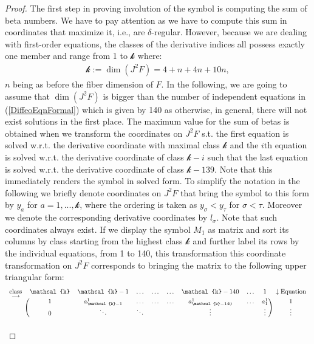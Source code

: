 \begin{proof}
The first step in proving involution of the symbol is computing the sum of beta numbers. We have to pay attention as we have to compute this sum in coordinates that maximize it, i.e., are $\delta$-regular. However, because we are dealing with first-order equations, the classes of the derivative indices all possess exactly one member and range from 1 to $\mathcal{k}$ where: 
\begin{align}
    \mathcal{k} := \operatorname{dim}(J^2F) = 4+n+4n+10n,
\end{align}
$n$ being as before the fiber dimension of $F$. 
In the following, we are going to assume that $\operatorname{dim}(J^2F)$ is bigger than the number of independent equations in (\ref{DiffeoEqnFormal}) which is given by 140 as otherwise, in general, there will not exist solutions in the first place. 
The maximum value for the sum of betas is obtained when we transform the coordinates on $J^2F$ s.t. the first equation is solved w.r.t. the derivative coordinate with maximal class $\mathcal{k}$ and the $i$th equation is solved w.r.t. the derivative coordinate of class $\mathcal{k}-i$ such that the last equation is solved w.r.t. the derivative coordinate of class $\mathcal{k}-139$.
Note that this immediately renders the symbol in solved form.
To simplify the notation in the following we briefly denote coordinates on $J^2F$ that bring the symbol to this form by $y_a$ for $a = 1,...,\mathcal{k}$, where the ordering is taken as $y_{\sigma} < y_{\tau}$ for $\sigma < \tau$. Moreover we denote the corresponding derivative coordinates by $l_{\sigma}$. 
Note that such coordinates always exist. 
If we display the symbol $M_1$ as matrix and sort its columns by class starting from the highest class $\mathcal{k}$ and further label its rows by the individual equations, from 1 to 140, this transformation this coordinate transformation on $J^2F$ corresponds to bringing the matrix to the following upper triangular form:
\begin{align}\label{symbolMat}
\begin{blockarray}{cccccccccc}
\underset{\longrightarrow}{\text{class}} & \mathcal{k} & \mathcal{k} -1 & \hdots & \hdots & \hdots & \mathcal{k}- 140 & \hdots & 1 & \downarrow \text{Equation} \\
\begin{block}{c(cccccccc)c}
   & 1 & a^1_{\mathcal{k}-1} & \hdots & \hdots & \hdots & a^1_{\mathcal{k} -140} & \hdots & a^1_1 & 1 \\
    & 0 & \ddots & \ddots & &  & \vdots & & \vdots & \vdots \\

\end{block}
\end{blockarray}
\end{align}
\end{proof}
